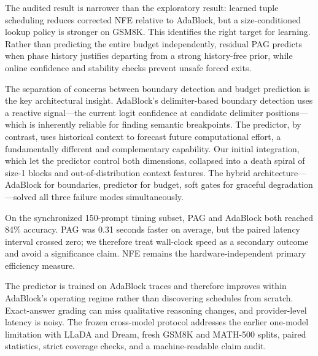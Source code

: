 \documentclass[11pt]{article}
\begin{document}
The audited result is narrower than the exploratory result: learned tuple scheduling reduces corrected NFE relative to AdaBlock, but a size-conditioned lookup policy is stronger on GSM8K. This identifies the right target for learning. Rather than predicting the entire budget independently, residual PAG predicts when phase history justifies departing from a strong history-free prior, while online confidence and stability checks prevent unsafe forced exits.

The separation of concerns between boundary detection and budget prediction is the key architectural insight. AdaBlock's delimiter-based boundary detection uses a reactive signal---the current logit confidence at candidate delimiter positions---which is inherently reliable for finding semantic breakpoints. The predictor, by contrast, uses historical context to forecast future computational effort, a fundamentally different and complementary capability. Our initial integration, which let the predictor control both dimensions, collapsed into a death spiral of size-1 blocks and out-of-distribution context features. The hybrid architecture---AdaBlock for boundaries, predictor for budget, soft gates for graceful degradation---solved all three failure modes simultaneously.

On the synchronized 150-prompt timing subset, PAG and AdaBlock both reached 84\% accuracy. PAG was 0.31 seconds faster on average, but the paired latency interval crossed zero; we therefore treat wall-clock speed as a secondary outcome and avoid a significance claim. NFE remains the hardware-independent primary efficiency measure.


The predictor is trained on AdaBlock traces and therefore improves within AdaBlock's operating regime rather than discovering schedules from scratch. Exact-answer grading can miss qualitative reasoning changes, and provider-level latency is noisy. The frozen cross-model protocol addresses the earlier one-model limitation with LLaDA and Dream, fresh GSM8K and MATH-500 splits, paired statistics, strict coverage checks, and a machine-readable claim audit.
\end{document}
